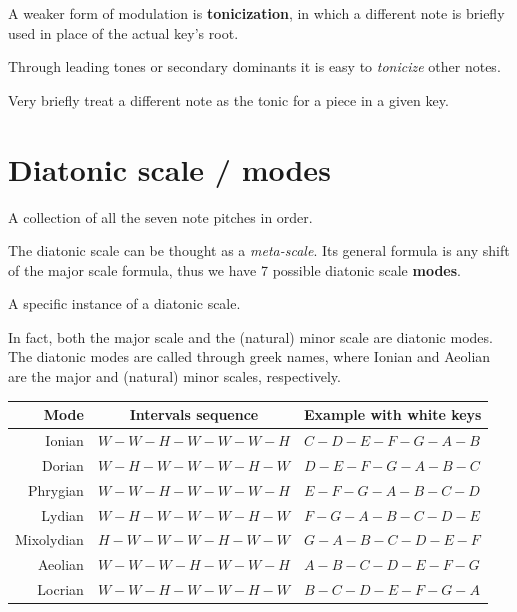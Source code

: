 A weaker form of modulation is \textbf{tonicization}, in which a different note is briefly used in place of the actual key's root.

Through leading tones or secondary dominants it is easy to \emph{tonicize} other notes.

\begin{definition}[Tonicization]
    Very briefly treat a different note as the tonic for a piece in a given key.
\end{definition}

\section{Diatonic scale / modes}
\begin{definition}
    A collection of all the seven note pitches in order.
\end{definition}

The diatonic scale can be thought as a \emph{meta-scale}. Its general formula is any shift of the major scale formula, thus we have 7 possible diatonic scale \textbf{modes}.

\begin{definition}
    A specific instance of a diatonic scale.
\end{definition}

In fact, both the major scale and the (natural) minor scale are diatonic modes. The diatonic modes are called through greek names, where {\color{OrangeRed}Ionian} and {\color{RoyalBlue}Aeolian} are the major and (natural) minor scales, respectively.

\begin{center}
    \begin{tabular}{r|c|l}
        \textbf{Mode} & \textbf{Intervals sequence} & \textbf{Example with white keys} \\
        \hline
        {\color{OrangeRed}Ionian} & $W-W-H-W-W-W-H$ & $C-D-E-F-G-A-B$ \\ 
        Dorian & $W-H-W-W-W-H-W$ & $D-E-F-G-A-B-C$ \\
        Phrygian & $W-W-H-W-W-W-H$ & $E-F-G-A-B-C-D$ \\
        Lydian & $W-H-W-W-W-H-W$ & $F-G-A-B-C-D-E$ \\
        Mixolydian & $H-W-W-W-H-W-W$ & $G-A-B-C-D-E-F$ \\
        {\color{RoyalBlue}Aeolian} & $W-W-W-H-W-W-H$ & $A-B-C-D-E-F-G$ \\
        Locrian & $W-W-H-W-W-H-W$ & $B-C-D-E-F-G-A$ \\
    \end{tabular}
\end{center}

